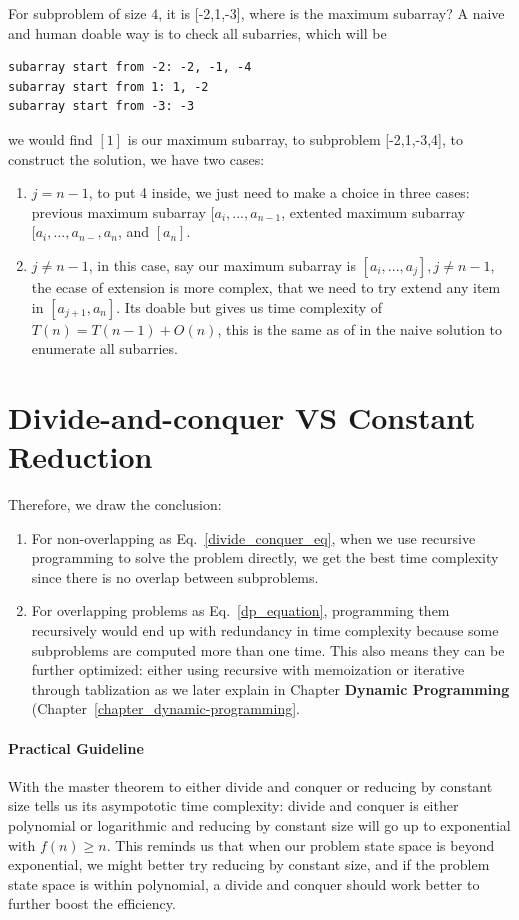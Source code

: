 \documentclass[../main.tex]{subfiles}
\begin{document}
For subproblem of size $4$, it is [-2,1,-3], where is the maximum subarray? A naive and human doable way is to check all subarries, which will be
\begin{lstlisting}[numbers=none]
subarray start from -2: -2, -1, -4
subarray start from 1: 1, -2
subarray start from -3: -3
\end{lstlisting}
we would find $[1]$ is our maximum subarray, to subproblem [-2,1,-3,4], to construct the solution, we have two cases:
\begin{enumerate}
    \item $j=n-1$, to put 4 inside, we just need to make a choice in three cases: previous maximum subarray $[a_i,...,a_{n-1}$, extented maximum subarray $[a_i,...,a_{n-},a_{n}$, and $[a_n]$.
    \item $j\neq n-1$, in this case, say our maximum subarray is $[a_i,...,a_j], j\neq n-1$, the ecase of extension is more complex, that we need to try extend any item in $[a_{j+1},a_n]$. Its doable but gives us time complexity of $T(n)=T(n-1)+O(n)$, this is the same as of in the naive solution to enumerate all subarries. 
\end{enumerate}
 \section{Divide-and-conquer VS Constant Reduction} Therefore, we draw the conclusion: 
 \begin{enumerate}
     \item For non-overlapping  as Eq.~\ref{divide_conquer_eq}, when we use recursive programming to solve the problem directly, we get the best time complexity since there is no overlap between subproblems.
     \item For overlapping problems as Eq.~\ref{dp_equation}, programming them recursively would end up with redundancy in time complexity because some subproblems are computed more than one time. This also means they can be further optimized: either using recursive with memoization or iterative through tablization as we later explain in Chapter \textbf{Dynamic Programming} (Chapter~\ref{chapter_dynamic-programming}. 
 \end{enumerate}
 \paragraph{Practical Guideline}
With the master theorem to either divide and conquer or reducing by constant size tells us its asympototic time complexity: divide and conquer is either polynomial or logarithmic and reducing by constant size will go up to exponential with $f(n)\geq n$. This reminds us that when our problem state space is beyond exponential, we might better try reducing by constant size, and if the problem state space is within polynomial, a divide and conquer should work better to further boost the efficiency. 
 
\end{document}

